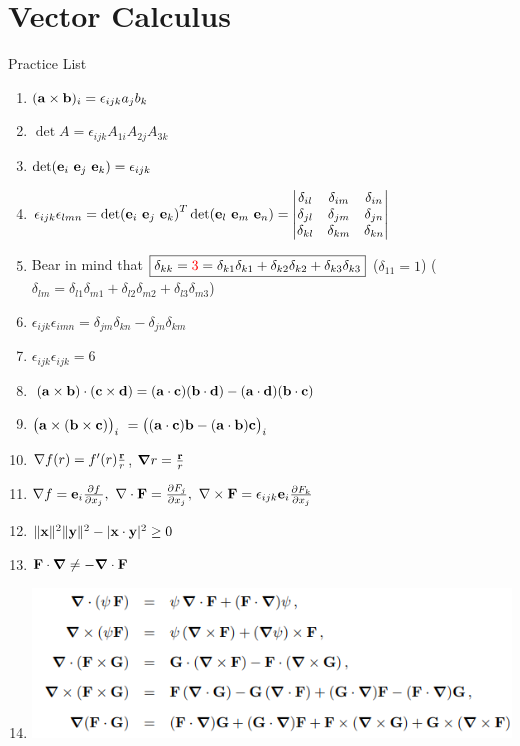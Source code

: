 \documentclass{article}
\theoremstyle{remark}
\theoremstyle{remark}
\begin{document}
    \section*{Vector Calculus}
    Practice List\begin{enumerate}
        \item $(\vb{a}\times\vb{b})_i=\epsilon_{ijk}a_j b_k $
        \item $\det A=\epsilon_{ijk}A_{1i}A_{2j}A_{3k} $
        \item $\det(\vb{e}_i\ \vb{e}_j\ \vb{e}_k)=\epsilon_{ijk} $
        \item $\epsilon_{ijk}\epsilon_{lmn} = \det(\vb{e}_i\ \vb{e}_j\ \vb{e}_k)^T\det(\vb{e}_l\ \vb{e}_m\ \vb{e}_n) = \begin{vmatrix}
            \delta_{il} & \delta_{im} & \delta_{in}\\
            \delta_{jl} & \delta_{jm} & \delta_{jn}\\
            \delta_{kl} & \delta_{km} & \delta_{kn}
        \end{vmatrix}$
        \item Bear in mind that $\boxed{\delta_{kk}=\textcolor{red}{3}=\delta_{k1}\delta_{k1}+\delta_{k2}\delta_{k2}+\delta_{k3}\delta_{k3}}$ ($\delta_{11}=1$) ($\delta_{lm}=\delta_{l1}\delta_{m1}+\delta_{l2}\delta_{m2}+\delta_{l3}\delta_{m3}$)
        \item $\epsilon_{ijk}\epsilon_{imn}=\delta_{jm}\delta_{kn}-\delta_{jn}\delta_{km} $
        \item $\boxed{\epsilon_{ijk}\epsilon_{ijk}=6}$
        \item $(\vb{a}\times\vb{b})\cdot(\vb{c}\times\vb{d})=(\vb{a}\cdot\vb{c})(\vb{b}\cdot\vb{d})-(\vb{a}\cdot\vb{d})(\vb{b}\cdot\vb{c}) $
        \item $\big(\vb{a}\times(\vb{b}\times\vb{c})\big)_{i}\ =\big((\vb{a}\cdot\vb{c})\vb{b}-(\vb{a}\cdot\vb{b})\vb{c}\big)_{i} $
        \item $\nabla f(r)=f'(r)\frac{\vb{r}}{r} $, $\grad r = \frac{\vb{r}}{r} $
        \item $\nabla f = \vb{e}_i\pdv{f}{x_j},\ \nabla\cdot\vb{F}=\pdv{F_j}{x_j},\ \nabla\times\vb{F}=\epsilon_{ijk}\vb{e}_i\pdv{F_k}{x_j} $
        \item $\|\vb{x}\|^2\|\vb{y}\|^2-|\vb{x}\cdot\vb{y}|^2\geq 0 $
        \item $\vb{F}\cdot\grad\neq-\grad\cdot\vb{F} $
        \item \includegraphics*[width=0.75\linewidth]{vec_identities.png}

\end{enumerate}
\end{document}
